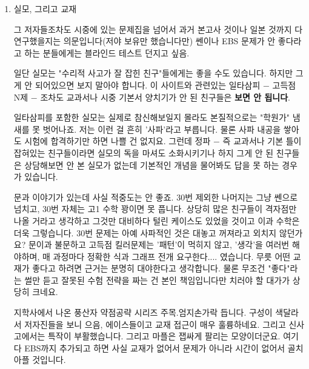 \vspace{5mm}

\begin{enumerate}
        

    \item 실모, 그리고 교재
    \vspace{5mm}

    그 저자들조차도 시중에 있는 문제집을 넘어서 과거 본고사 것이나 일본 것까지 다 연구했을지는 의문입니다(저야 보유만 했습니다만)
    쎈이나 EBS 문제가 안 좋다라고 하는 분들에게는 블라인드 테스트 던지고 싶음.
    \vspace{5mm}

    일단 실모는 "수리적 사고가 잘 잡힌 친구"들에게는 좋을 수도 있습니다. 하지만 그게 안 되어있으면 보지 말아야 합니다.
    이 사이트와 관련있는 일타삼피 $-$ 고득점 N제 $-$ 조차도 교과서나 시중 기본서 양치기가 안 된 친구들은 \textbf{보면 안 됩니다}.
    \vspace{5mm}

    일타삼피를 포함한 실모는 실제로 참신해보일지 몰라도 본질적으로는 "학원가" 냄새를 못 벗어나죠.
    저는 이런 걸 흔히 '사파'라고 부릅니다. 물론 사파 내공을 쌓아도 시험에 합격하기만 하면 나쁠 건 없지요.
    그런데 정파 $-$ 즉 교과서나 기본 틀이 잡혀있는 친구들이라면 실모의 독을 마셔도 소화시키기나 하지
    그게 안 된 친구들은 상담해보면 안 본 실모가 없는데 기본적인 개념을 물어봐도 답을 못 하는 경우가 있습니다.
    \vspace{5mm}

    문과 이야기가 있는데 사실 적중도는 안 좋죠. 30번 제외한 나머지는 그냥 쎈으로 넘치고, 30번 자체는 고1 수학 꽝이면 못 풉니다.
    상당히 많은 친구들이 격자점만 나올 거라고 생각하고 그것만 대비하다 털린 케이스도 있었을 것이고
    이과 수학은 더욱 그렇습니다. 30번 문제는 아예 사파적인 것은 대놓고 꺼져라고 외치지 않던가요?
    문이과 불문하고 고득점 킬러문제는 '패턴'이 먹히지 않고, '생각'을 여러번 해야하며, 매 과정마다 정확한 식과 그래프 전개 요구한다.... 였습니다.
    무릇 어떤 교재가 좋다고 하려면 근거는 분명히 대야한다고 생각합니다.
    물론 무조건 "좋다"라는 썰만 듣고 잘못된 수험 전략을 짜는 건 본인 책임입니다만 치러야 할 대가가 상당히 크네요.
    \vspace{5mm}

    지학사에서 나온 풍산자 약점공략 시리즈 주목.엄지손가락 듭니다.
    구성이 색달라서 저자진들을 보니 으음, 에이스들이고 교재 접근이 매우 훌륭하네요.
    그리고 신사고에서는 특작이 부활했습니다.
    그리고 마플은 잽싸게 팔리는 모양이더군요.
    여기다 EBS까지 추가되고 하면 사실 교재가 없어서 문제가 아니라 시간이 없어서 골치아플 것입니다.
    \vspace{5mm}


\end{enumerate}
